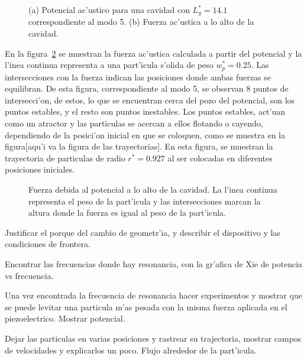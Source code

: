 \begin{figure}


\caption{\label{fig:U-F}
(a) Potencial ac'ustico para una cavidad con $L_y^\ast=14.1$ correspondiente al modo 5.
(b) Fuerza ac'ustica a lo alto de la cavidad.
}
\end{figure}
En la figura~\ref{fig:F-wp} se muestran la fuerza ac'ustica calculada a partir del
potencial y la l'inea continua representa a una part'icula s'olida de peso $w_p^\ast=0.25$.
Las intersecciones con la fuerza indican las posiciones donde ambas fuerzas se equilibran.
De esta figura, correspondiente al modo 5, se observan 8 puntos de intersecci'on, de
estos, lo que se encuentran cerca del pozo del potencial, son los puntos estables, y el
resto son puntos inestables. Los puntos estables, act'uan como un atractor y las particulas
se acercan a ellos flotando o cayendo, dependiendo de la posici'on inicial en que se coloquen,
como se muestra en la figura[aqu'i va la figura de las trayectorias]. En esta figura, se
muestran la trayectoria de particulas de radio $r^\ast=0.927$ al ser colocadas en diferentes
posiciones iniciales.
\begin{figure}

\caption{\label{fig:F-wp}
Fuerza debida al potencial a lo alto de la cavidad. La l'inea continua
representa el peso de la part'icula y las intersecciones marcan la altura
donde la fuerza es igual al peso de la part'icula.
}
\end{figure}
Justificar el porque del cambio de geometr'ia, y 
describir el dispositivo y las condiciones de frontera.

Encontrar las frecuencias donde hay resonancia, con la gr'afica
de Xie de potencia vs frecuencia.

Una vez encontrada la frecuencia de resonancia hacer 
experimentos y mostrar que se puede levitar una particula
m'as pesada con la misma fuerza aplicada en el piezoelectrico.
Mostrar potencial.

Dejar las particulas en varias posiciones y rastrear su trajectoria,
mostrar campos de velocidades y explicarlos un poco.
Flujo alrededor de la part'icula.


